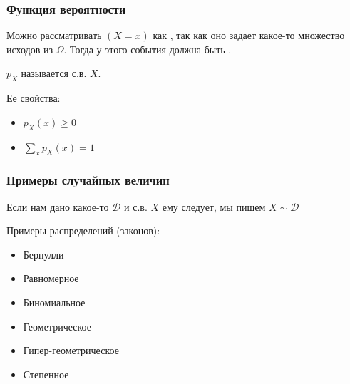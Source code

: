 \documentclass[hyperref=unicode,graphics=pdflatex,13pt,xcolor={usenames,dvipsnames}]{beamer}
\renewcommand\emph[1]{{\color{blue}{#1}}}
\begin{document}
\begin{frame}
  \frametitle{Функция вероятности}

  Можно рассматривать $(X = x)$ как \emph{событие}, так как оно задает какое-то множество исходов из $\Omega$. Тогда у этого события должна быть \emph{вероятность}.
  
  \pause

  \begin{center}
  \end{center}

  $p_X$ называется \emph{функцией вероятности} с.в. $X$.

  \pause
  Ее свойства:
  \begin{itemize}
    \item $p_X(x) \ge 0$
    \item $\sum_x p_X(x) = 1$
  \end{itemize}
\end{frame}

\begin{frame}
  \frametitle{Примеры случайных величин}
  Если нам дано какое-то \emph{распределение} $\mathcal{D}$ и с.в. $X$ ему следует, мы пишем $X \sim \mathcal{D}$ 

  Примеры распределений (законов):
  \begin{itemize}
    \item Бернулли
    \item Равномерное
    \item Биномиальное
    \item Геометрическое
    \item Гипер-геометрическое
    \item Степенное
  \end{itemize}
\end{frame}
\end{document}
